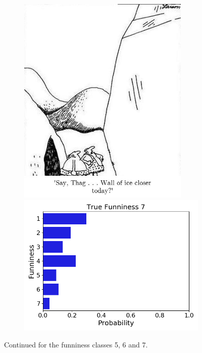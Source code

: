 \documentclass[draft,final,oneside]{vutinfth} %
\begin{document}
\begin{figure}
\begin{subfigure}[b]{0.45\textwidth}
\centering
\includegraphics[width=0.9\textwidth,height=0.3\textheight,keepaspectratio]{graphics/detail/Test_for_Image_7_cartoon} \\
\includegraphics[width=1.0\textwidth]{graphics/detail/Test_for_Image_7}
\end{subfigure}\quad
\caption{Continued for the funniness classes 5, 6 and 7.}
\label{fig:figdistr2}

\end{figure}
\end{document}
